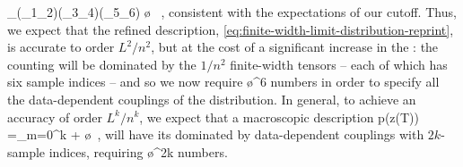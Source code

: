 \be
{} \SPV_{(\delta_1\delta_2)(\delta_3\delta_4)(\delta_5\delta_6)} \propto \o{} \, ,
\ee
consistent with the expectations of our  cutoff.
Thus, we expect that the refined description, \eqref{eq:finite-width-limit-distribution-reprint}, is accurate to order $L^2/n^2$, but at the cost of a significant increase in the :
the counting will be dominated by the $1/n^2$ finite-width tensors -- each of which has six sample indices -- and so we now
require 
\be
\o{\ND^6}
\ee 
numbers in order to specify all the data-dependent couplings of the distribution.
In general, to achieve an accuracy of order $L^k/n^k$, we expect that a
macroscopic
description
\be\label{eq:finite-width-limit-distribution-reprint-more-terms}
p\Big(z(T)\Big) =\sum_{m=0}^{k} + \o{}\, ,
\ee
will have its  dominated by data-dependent couplings with $2k$-sample indices, requiring 
\be
\o{\ND^{2k}}
\ee
numbers.
